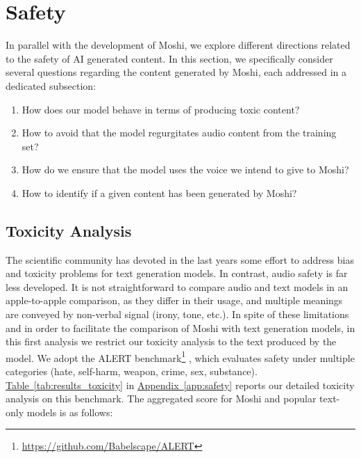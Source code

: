 \section{Safety}
\label{sec:safety}

In parallel with the development of Moshi, we explore different directions related to the safety of AI generated content. In this section, we specifically consider several questions regarding the content generated by Moshi, each addressed in a dedicated subsection: 
\begin{enumerate}
\item How does our model behave in terms of producing toxic content? 
\item How to avoid that the model regurgitates audio content from the training set? 
\item How do we ensure that the model uses the voice we intend to give to Moshi? 
\item How to identify if a given content has been generated by Moshi? 
\end{enumerate}



\subsection{Toxicity Analysis}

The scientific community has devoted in the last years some effort to address bias and toxicity problems for text generation models. In contrast, audio safety is far less developed. It is not straightforward to compare audio and text models in an apple-to-apple comparison, as they differ in their usage, and multiple meanings are conveyed by non-verbal signal (irony, tone, etc.). In spite of these limitations and in order to facilitate the comparison of Moshi with text generation models, in this first analysis we restrict our toxicity analysis to the text produced by the model. We adopt the ALERT benchmark\footnote{\url{https://github.com/Babelscape/ALERT}} \citep{tedeschi2024alert}, which evaluates safety under multiple categories (hate, self-harm, weapon, crime, sex, substance). 
\hyperref[tab:results_toxicity]{Table~\ref{tab:results_toxicity}} in \hyperref[app:safety]{Appendix~\ref{app:safety}} reports our detailed toxicity analysis on this benchmark. The aggregated score for Moshi and popular text-only models is as follows: 
\medskip


\noindent
{}
\medskip

